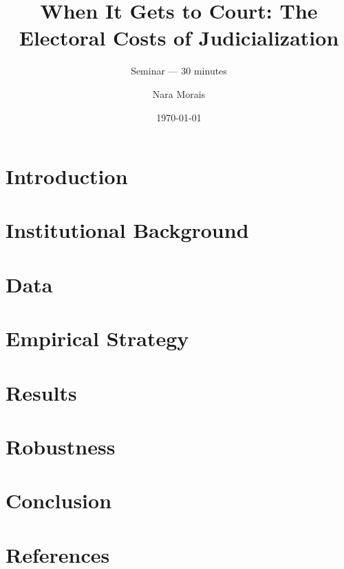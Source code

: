 \documentclass[aspectratio=169,10pt]{beamer}
\title{When It Gets to Court: The Electoral Costs of Judicialization}
\subtitle{Seminar --- 30 minutes}
\author{Nara Morais}
\institute{FEA--USP}
\date{\today}
\begin{document}
\maketitle

\section{Introduction}




\section{Institutional Background}



\section{Data}





\section{Empirical Strategy}




\section{Results}










\section{Robustness}



\section{Conclusion}



\section{References}

\end{document}
